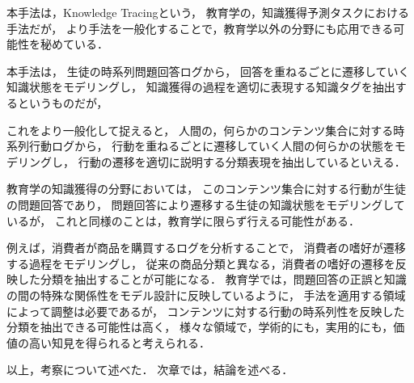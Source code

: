 本手法は，Knowledge Tracingという，
教育学の，知識獲得予測タスクにおける手法だが，
より手法を一般化することで，教育学以外の分野にも応用できる可能性を秘めている．

本手法は，
生徒の時系列問題回答ログから，
回答を重ねるごとに遷移していく知識状態をモデリングし，
知識獲得の過程を適切に表現する知識タグを抽出するというものだが，

これをより一般化して捉えると，
人間の，何らかのコンテンツ集合に対する時系列行動ログから，
行動を重ねるごとに遷移していく人間の何らかの状態をモデリングし，
行動の遷移を適切に説明する分類表現を抽出しているといえる．

教育学の知識獲得の分野においては，
このコンテンツ集合に対する行動が生徒の問題回答であり，
問題回答により遷移する生徒の知識状態をモデリングしているが，
これと同様のことは，教育学に限らず行える可能性がある．

例えば，消費者が商品を購買するログを分析することで，
消費者の嗜好が遷移する過程をモデリングし，
従来の商品分類と異なる，消費者の嗜好の遷移を反映した分類を抽出することが可能になる．
教育学では，問題回答の正誤と知識の間の特殊な関係性をモデル設計に反映しているように，
手法を適用する領域によって調整は必要であるが，
コンテンツに対する行動の時系列性を反映した分類を抽出できる可能性は高く，
様々な領域で，学術的にも，実用的にも，価値の高い知見を得られると考えられる．




\vvspace
以上，考察について述べた．
次章では，結論を述べる．
